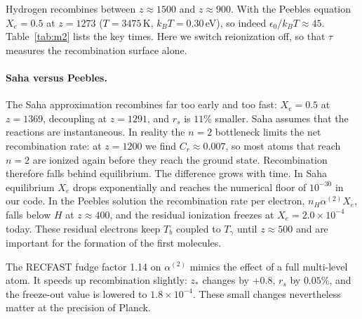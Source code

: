 Hydrogen recombines between $z\approx1500$ and $z\approx900$. With the Peebles equation $X_e=0.5$ at $z=1273$
($T=3475$\,K, $k_BT=0.30$\,eV), so indeed $\epsilon_0/k_BT\approx45$. Table~\ref{tab:m2} lists the key times. Here we
switch reionization off, so that $\tau$ measures the recombination surface alone.

\paragraph*{Saha versus Peebles.} The Saha approximation recombines far too early and too fast: $X_e=0.5$ at $z=1369$,
decoupling at $z=1291$, and $r_s$ is $11\%$ smaller. Saha assumes that the reactions are instantaneous. In reality the
$n=2$ bottleneck limits the net recombination rate: at $z=1200$ we find $C_r\approx0.007$, so most atoms that
reach $n=2$ are ionized again before they reach the ground state. Recombination therefore falls behind equilibrium.
The difference grows with time. In Saha equilibrium $X_e$ drops exponentially and reaches the numerical floor of
$10^{-30}$ in our code. In the Peebles solution the recombination rate per electron, $n_H\alpha^{(2)}X_e$, falls below
$H$ at $z\approx400$, and the residual ionization freezes at $X_e=2.0\times10^{-4}$ today. These residual electrons keep
$T_b$ coupled to $T_\gamma$ until $z\approx500$ and are important for the formation of the first molecules.

The RECFAST fudge factor 1.14 on $\alpha^{(2)}$ mimics the effect of a full multi-level atom. It speeds up recombination
slightly: $z_*$ changes by $+0.8$, $r_s$ by $0.05\%$, and the freeze-out value is lowered to $1.8\times10^{-4}$. These
small changes nevertheless matter at the precision of Planck.


